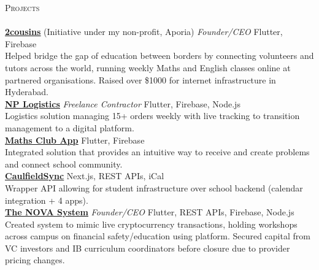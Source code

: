 \documentclass[a4paper]{article}
\newcommand{\lineunder} {
    \vspace*{-8pt} \\
    \hspace*{-10pt} \hrulefill \\
}
\newcommand{\header} [1] {
    {\hspace*{-10pt}\vspace*{6pt} \textsc{#1}}
    \vspace*{-6pt} \lineunder
}
\begin{document}
\header{Projects}
\href{https://2cousins.org/}{\textbf{\ul{2cousins}}} (Initiative under my non-profit, Aporia) \textit{Founder/CEO} {\textsl{\hfill} Flutter, Firebase}\\
Helped bridge the gap of education between borders by connecting volunteers and tutors across the world, running weekly Maths and English classes online at partnered organisations.
Raised over \$1000 for internet infrastructure in Hyderabad.\\
\vspace*{1.5mm}
\href{https://nplogistics.com.au}{\textbf{\ul{NP Logistics}}} \textit{Freelance Contractor} {\textsl{\hfill} Flutter, Firebase, Node.js}\\
Logistics solution managing 15+ orders weekly with live tracking to transition management to a digital platform.\\
\vspace*{1.5mm}
\href{https://github.com/cgs-math/app}{\textbf{\ul{Maths Club App}}} {\textsl{\hfill} Flutter, Firebase}\\
Integrated solution that provides an intuitive way to receive and create problems and connect school community.\\
\vspace*{1.5mm}
\href{https://caulfieldsync.vercel.app/}{\textbf{\ul{CaulfieldSync}}} {\textsl{\hfill} Next.js, REST APIs, iCal}\\
Wrapper API allowing for student infrastructure over school backend (calendar integration + 4 apps).\\
\vspace*{1.5mm}
\href{https://the-nova-system.github.io/}{\textbf{\ul{The NOVA System}}} \textit{Founder/CEO} {\textsl{\hfill} Flutter, REST APIs, Firebase, Node.js}\\
Created system to mimic live cryptocurrency transactions, holding workshops across campus on financial safety/education using platform.
Secured capital from VC investors and IB curriculum coordinators before closure due to provider pricing changes.\\
\vspace*{1.5mm}

\end{document}
